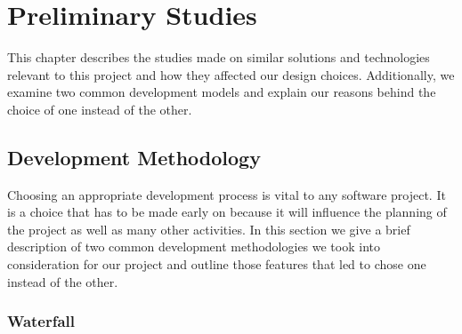\chapter{Preliminary Studies}
\label{Preliminary Studies}

This chapter describes the studies made on similar solutions and technologies relevant
to this project and how they affected our design choices. Additionally, we examine two common development
models and explain our reasons behind the choice of one instead of the other.



\section{Development Methodology}
\label{section:development-methodology}

Choosing an appropriate development process is vital to any software project.
It is a choice that has to be made early on because it will influence the planning of the project
as well as many other activities. In this section we give a brief description of two common development
methodologies we took into consideration for our project and outline those features that led to chose one
instead of the other.

\subsection{Waterfall} \nocite{WaterfallModel}

